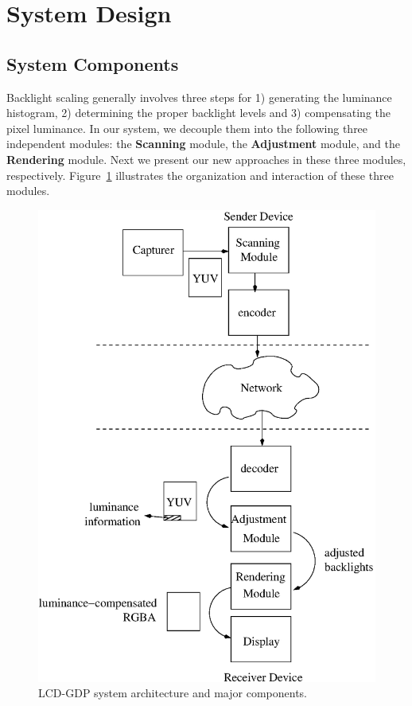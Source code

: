 \section{System Design}
\label{sec:design}

\subsection{System Components}
Backlight scaling generally involves three
steps for 1) generating the luminance histogram, 2) determining the
proper backlight levels and 3) compensating the pixel luminance. In
our system, we decouple them into the following three independent
modules: the {\bf Scanning} module, the {\bf Adjustment} module, and
the {\bf Rendering} module. Next we present our new approaches in
these three modules, respectively. Figure~\ref{fig:design} illustrates
the organization and interaction of these three modules.

\begin{figure}[t]
  \centering
  \includegraphics[width=.45\textwidth]{./figures/design.eps}
  \caption{LCD-GDP system architecture and major components.}
\label{fig:design}
\vspace{-1em}
\end{figure}



